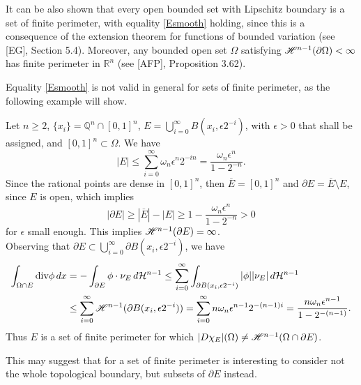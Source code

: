 \begin{remark} \label{finpersetexample} It can be also shown that every open bounded set with Lipschitz boundary is a set of finite perimeter, with equality \eqref{Esmooth} holding, since this is a consequence of the extension theorem for functions of bounded variation (see [EG], Section 5.4). Moreover, any bounded open set $\Omega$ satisfying $\mathscr{H}^{n - 1}(\partial \Omega) < \infty$ has finite perimeter in $\mathbb{R}^{n}$ (see [AFP], Proposition 3.62).
\end{remark}

Equality \eqref{Esmooth} is not valid in general for sets of finite perimeter, as the following example will show. 

\begin{example} Let $n \ge 2$, $\{ x_{i} \} = \mathbb{Q}^{n} \cap [0, 1]^{n}$, $E = \bigcup_{i = 0}^{\infty} B(x_{i}, \epsilon 2^{-i})$, with $\epsilon > 0$ that shall be assigned, and $[0, 1]^{n} \subset \Omega$. We have
\[ |E| \le \sum_{i = 0}^{\infty} \omega_{n} \epsilon^{n} 2^{-i n} = \frac{\omega_{n} \epsilon^{n}}{1 - 2^{- n}}. \]
Since the rational points are dense in $[0, 1]^{n}$, then $\overline{E} = [0, 1]^{n}$ and $\partial E = \overline{E} \setminus E$, since $E$ is open, which implies
\[ |\partial E| \ge |\overline{E}| - |E| \ge 1 - \frac{\omega_{n} \epsilon^{n}}{1 - 2^{- n}} > 0 \]
for $\epsilon$ small enough. This implies $\mathscr{H}^{n - 1}(\partial E) = \infty$. 
\\
Observing that $\partial E \subset \bigcup_{i = 0}^{\infty} \partial B(x_{i}, \epsilon 2^{- i})$, we have
\begin{align*} \int_{\Omega \cap E} \mathrm{div} \phi \, dx &  = - \int_{\partial E} \phi \cdot \nu_{E} \, d\mathcal{H}^{n - 1} \le \sum_{i = 0}^{\infty} \int_{\partial B(x_{i}, \epsilon 2^{- i})} |\phi| |\nu_{E}| \, d\mathcal{H}^{n - 1} \\
& \le  \sum_{i = 0}^{\infty} \mathscr{H}^{n - 1}(\partial B(x_{i}, \epsilon 2^{- i})) = \sum_{i = 0}^{\infty} n \omega_{n} \epsilon^{n - 1} 2^{- (n - 1) i} = \frac{n \omega_{n} \epsilon^{n - 1}}{1 - 2^{- (n - 1)}}.
\end{align*}
Thus $E$ is a set of finite perimeter for which $|D \chi_{E}|(\Omega) \neq \mathscr{H}^{n - 1}(\Omega \cap \partial E)$. 
\end{example}

This may suggest that for a set of finite perimeter is interesting to consider not the whole topological boundary, but subsets of $\partial E$ instead.






